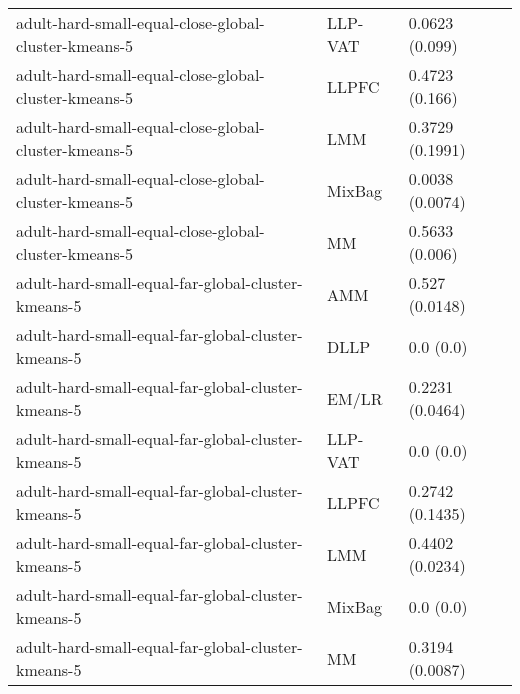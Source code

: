 \begin{longtable}{lll}
                                                         adult-hard-small-equal-close-global-cluster-kmeans-5 &   LLP-VAT &                        0.0623 (0.099) \\
                                                         adult-hard-small-equal-close-global-cluster-kmeans-5 &     LLPFC &                        0.4723 (0.166) \\
                                                         adult-hard-small-equal-close-global-cluster-kmeans-5 &       LMM &                       0.3729 (0.1991) \\
                                                         adult-hard-small-equal-close-global-cluster-kmeans-5 &    MixBag &                       0.0038 (0.0074) \\
                                                         adult-hard-small-equal-close-global-cluster-kmeans-5 &        MM &                        0.5633 (0.006) \\
                                                           adult-hard-small-equal-far-global-cluster-kmeans-5 &       AMM &                        0.527 (0.0148) \\
                                                           adult-hard-small-equal-far-global-cluster-kmeans-5 &      DLLP &                             0.0 (0.0) \\
                                                           adult-hard-small-equal-far-global-cluster-kmeans-5 &     EM/LR &                       0.2231 (0.0464) \\
                                                           adult-hard-small-equal-far-global-cluster-kmeans-5 &   LLP-VAT &                             0.0 (0.0) \\
                                                           adult-hard-small-equal-far-global-cluster-kmeans-5 &     LLPFC &                       0.2742 (0.1435) \\
                                                           adult-hard-small-equal-far-global-cluster-kmeans-5 &       LMM &                       0.4402 (0.0234) \\
                                                           adult-hard-small-equal-far-global-cluster-kmeans-5 &    MixBag &                             0.0 (0.0) \\
                                                           adult-hard-small-equal-far-global-cluster-kmeans-5 &        MM &                       0.3194 (0.0087) \\

\end{longtable}
